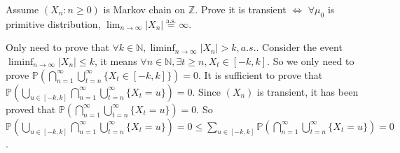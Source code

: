 \documentclass[../main]{subfiles}
\begin{document}
\begin{problem}\label{pro:4}
  Assume \((X_n:n \geq 0)\) is Markov chain on \(\mathbb{Z}\). Prove it is transient \(\iff\)
  \(\forall \mu_0\) is primitive distribution, \(\lim_{n \to \infty} |X_n| \overset{\text{a.s.}}{=} \infty\).
\end{problem}
\begin{solution}
  Only need to prove that \(\forall k \in \mathbb{N},\liminf_{n \to \infty}|X_n|>k,a. s.\).
  Consider the event \(\liminf_{n \to \infty}|X_n|\leq k\), it means \(\forall n \in \mathbb{N},\exists t \geq n,X_t \in [-k,k]\).
  So we only need to prove \(\mathbb{P}\left(\bigcap_{n=1}^{\infty} \bigcup_{t=n}^{\infty} \{X_t \in [-k,k]\}\right)=0\).
  It is sufficient to prove that \(\mathbb{P}(\bigcup_{u \in [-k,k]}\bigcap_{n=1}^{\infty} \bigcup_{t=n}^{\infty} \{X_t=u\})=0\).
  Since \((X_n)\) is transient, it has been proved that \(\mathbb{P}(\bigcap_{n=1}^{\infty} \bigcup_{t=n}^{\infty} \{X_t=u\})=0\).
  So \(\mathbb{P}(\bigcup_{u \in [-k,k]}\bigcap_{n=1}^{\infty} \bigcup_{t=n}^{\infty} \{X_t=u\})=0 \leq \sum_{u \in [-k,k]}\mathbb{P}(\bigcap_{n=1}^{\infty} \bigcup_{t=n}^{\infty} \{X_t=u\})=0\).
\end{solution}
\end{document}
